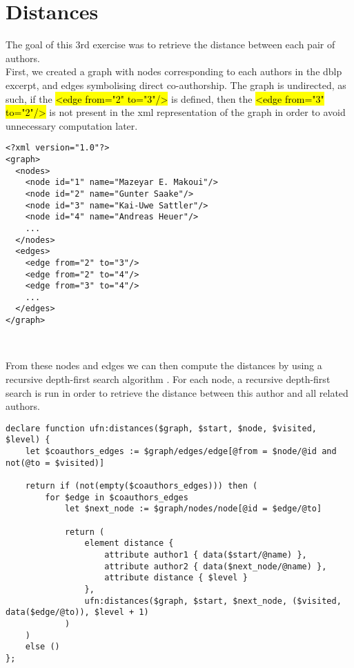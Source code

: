 \section{Distances}

\noindent The goal of this 3rd exercise was to retrieve the distance between
each pair of authors.\\

First, we created a graph with nodes corresponding to each authors in the dblp
excerpt, and edges symbolising direct co-authorship. The graph is undirected,
as such, if the \hl{<edge from="2" to="3"/>} is defined, then the
\hl{<edge from="3" to="2"/>} is not present in the xml representation of the
graph in order to avoid unnecessary computation later.\\

\begin{lstlisting}[caption=Example of generated graph]
<?xml version="1.0"?>
<graph>
  <nodes>
    <node id="1" name="Mazeyar E. Makoui"/>
    <node id="2" name="Gunter Saake"/>
    <node id="3" name="Kai-Uwe Sattler"/>
    <node id="4" name="Andreas Heuer"/>
    ...
  </nodes>
  <edges>
    <edge from="2" to="3"/>
    <edge from="2" to="4"/>
    <edge from="3" to="4"/>
    ...
  </edges>
</graph>
\end{lstlisting}
\

From these nodes and edges we can then compute the distances by using a
recursive depth-first search algorithm \cite{cite:sodfs}. For each node, a
recursive depth-first search is run in order to retrieve the distance between
this author and all related authors.\\

\begin{lstlisting}
declare function ufn:distances($graph, $start, $node, $visited, $level) {
    let $coauthors_edges := $graph/edges/edge[@from = $node/@id and not(@to = $visited)]
    
    return if (not(empty($coauthors_edges))) then (
        for $edge in $coauthors_edges
            let $next_node := $graph/nodes/node[@id = $edge/@to]
            
            return (
                element distance {
                    attribute author1 { data($start/@name) },
                    attribute author2 { data($next_node/@name) },
                    attribute distance { $level }
                },
                ufn:distances($graph, $start, $next_node, ($visited, data($edge/@to)), $level + 1)
            )
    )
    else ()
};
\end{lstlisting}
\

